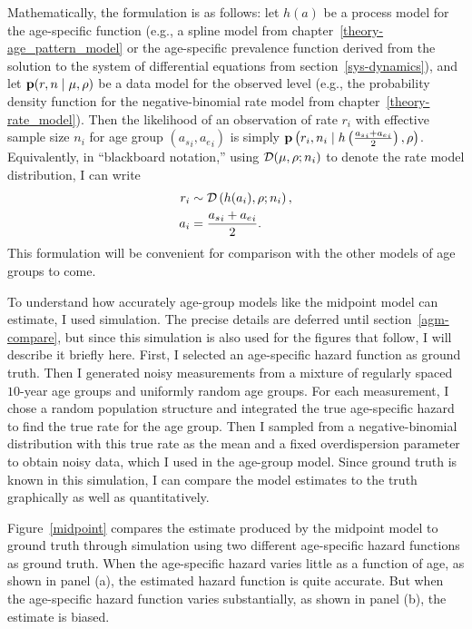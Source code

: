 Mathematically, the formulation is as follows: let $h(a)$ be a
process model for the age-specific function (e.g., a spline model
from chapter~\ref{theory-age_pattern_model} or the age-specific prevalence function derived from the solution to the system of differential equations from section~\ref{sys-dynamics}), and let $\mathbf{p}(r,n\;|\;
\mu,\rho)$ be a data model for the observed level (e.g., the probability
density function for the negative-binomial rate model from
chapter~\ref{theory-rate_model}).
Then the likelihood of an observation of rate $r_i$ with effective
sample size $n_i$ for age group $({a_s}_i, {a_e}_i)$ is simply
$\mathbf{p}\left(r_i, n_i \;|\; h\left(\frac{{a_s}_i+{a_e}_i}{2}\right),
\rho\right)$. Equivalently, in ``blackboard notation,'' using
$\mathcal{D}(\mu, \rho; n_i)$ to denote the rate model distribution, I can
write
\begin{align*}
r_i &\sim \mathcal{D}\left(h(a_i), \rho; n_i\right),\\
a_i &= \frac{{a_s}_i+{a_e}_i}{2}.
\end{align*}
This formulation will be convenient for comparison with the other models of age groups to come.

To understand how accurately age-group models like the midpoint model
can estimate, I used simulation.  The precise details are deferred
until section~\ref{agm-compare}, but since this simulation is also used for the
figures that follow, I will describe it briefly here.  First, I
selected an age-specific hazard function as ground truth.  Then I
generated noisy measurements from a mixture of regularly spaced
$10$-year age groups and uniformly random age groups.  For each
measurement, I chose a random population structure and integrated the
true age-specific hazard to find the true rate for the age group.
Then I sampled from a negative-binomial distribution with this true
rate as the mean and a fixed overdispersion parameter to obtain noisy
data, which I used in the age-group model.  Since ground truth is
known in this simulation, I can compare the model estimates to the
truth graphically as well as quantitatively.

Figure~\ref{midpoint} compares the estimate produced by the midpoint
model to ground truth through simulation using two different
age-specific hazard functions as ground truth.  When the age-specific
hazard varies little as a function of age, as shown in panel (a), the
estimated hazard function is quite accurate.  But when the age-specific hazard function
varies substantially, as shown in panel (b), the estimate is biased.


